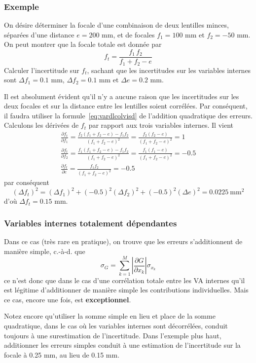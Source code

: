 \documentclass[main.tex]{subfiles}
\begin{document}
\subsubsection*{Exemple}\label{sec:exopt}

On désire déterminer la focale d'une combinaison de deux lentilles minces, séparées d'une distance $e=200$ mm, et de focales $f_1=100$ mm et $f_2=-50$ mm. On peut montrer que la focale totale est donnée par
$$
    f_t=\frac{f_1\,f_2}{f_1+f_2-e}
$$
Calculer l'incertitude sur $f_t$, sachant que les incertitudes sur les variables internes sont $\Delta f_1=0.1$ mm, $\Delta f_2=0.1$ mm et $\Delta e=0.2$ mm.

Il est absolument évident qu'il n'y a aucune raison que les incertitudes sur les deux focales et sur la distance entre les lentilles soient corrélées. Par conséquent, il faudra utiliser la formule~\ref{eq:vardlcolvisd} de l'addition quadratique des erreurs. Calculons les dérivées de $f_t$ par rapport aux trois variables internes. Il vient
\begin{gather*}
    \frac{\partial f_t}{\partial f_1}=\frac{f_2(f_1+f_2-e)-f_1f_2}{(f_1+f_2-e)^2}=
    \frac{f_2(f_2-e)}{(f_1+f_2-e)^2}=1\\
    \frac{\partial f_t}{\partial f_2}=\frac{f_1(f_1+f_2-e)-f_1f_2}{(f_1+f_2-e)^2}=
    \frac{f_1(f_1-e)}{(f_1+f_2-e)^2}=-0.5\\
    \frac{\partial f_t}{\partial e}=\frac{f_1f_2}{(f_1+f_2-e)^2}=-0.5
\end{gather*}
par conséquent
$$
    (\Delta f_t)^2=(\Delta f_1)^2+(-0.5)^2(\Delta f_2)^2+(-0.5)^2(\Delta e)^2=0.0225\ \text{mm}^2
$$
d'où $\Delta f_t=0.15$ mm.

\subsubsection{Variables internes totalement dépendantes}

Dans ce cas (très rare en pratique), on trouve que les erreurs s'additionnent de manière simple, c.-à-d. que
\begin{equation}
    \sigma_G=\sum\limits_{k=1}^{M}\left|\frac{\partial G}{\partial x_k}\right|\sigma_{x_k}
\end{equation}
ce n'est donc que dans le cas d'une corrélation totale entre les VA internes qu'il est légitime d'additionner de manière simple les contributions individuelles. Mais ce cas, encore une fois, est \textbf{exceptionnel}.

Notez encore qu'utiliser la somme simple en lieu et place de la somme quadratique, dans le cas où les variables internes sont décorrélées, conduit toujours à une surestimation de l'incertitude. Dans l'exemple plus haut, additionner les erreurs simples conduit à une estimation de l'incertitude sur la focale à 0.25 mm, au lieu de 0.15 mm.
\end{document}
